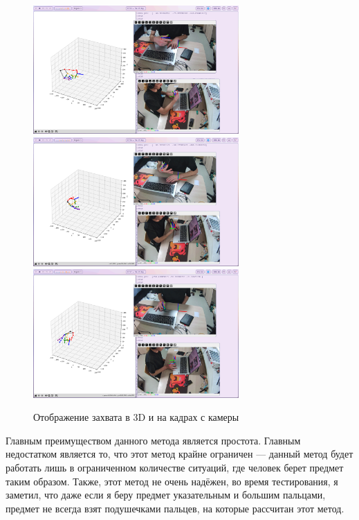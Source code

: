 \documentclass[14pt, a4paper]{extarticle}
\begin{document}
\begin{figure}
  \begin{center}
    \includegraphics[width=0.7\textwidth]{images/gripper-conversion/gripper-conversion-1.png}\hfill
    \includegraphics[width=0.7\textwidth]{images/gripper-conversion/gripper-conversion-2.png}\hfill
    \includegraphics[width=0.7\textwidth]{images/gripper-conversion/gripper-conversion-3.png}\hfill
  \end{center}
  \caption{Отображение захвата в 3D и на кадрах с камеры}\label{fig:basic_gripper_work}
\end{figure}

Главным преимуществом данного метода является простота. Главным недостатком
является то, что этот метод крайне ограничен --- данный метод будет работать
лишь в ограниченном количестве ситуаций, где человек берет предмет таким
образом. Также, этот метод не очень надёжен, во время тестирования, я заметил,
что даже если я беру предмет указательным и большим пальцами, предмет не всегда
взят подушечками пальцев, на которые рассчитан этот метод.
\end{document}
